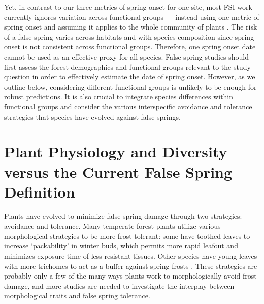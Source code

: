 \documentclass{article}\usepackage[]{graphicx}\usepackage[]{color}
\begin{document}
Yet, in contrast to our three metrics of spring onset for one site, most FSI work currently ignores variation across functional groups --- instead using one metric of spring onset and assuming it applies to the whole community of plants \citep{Marino2011, Peterson2014, Allstadt2015, Mehdipoor2017}. The risk of a false spring varies across habitats and with species composition since spring onset is not consistent across functional groups. Therefore, one spring onset date cannot be used as an effective proxy for all species. False spring studies should first assess the forest demographics and functional groups relevant to the study question in order to effectively estimate the date of spring onset. However, as we outline below, considering different functional groups is unlikely to be enough for robust predictions. It is also crucial to integrate species differences within functional groups and consider the various interspecific avoidance and tolerance strategies that species have evolved against false springs. %

\section {Plant Physiology and Diversity versus the Current False Spring Definition}
Plants have evolved to minimize false spring damage through two strategies: avoidance and tolerance. Many temperate forest plants utilize various morphological strategies to be more frost tolerant: some have toothed leaves to increase `packability' in winter buds, which permits more rapid leafout \citep{Edwards2017} and minimizes exposure time of less resistant tissues. Other species have young leaves with more trichomes to act as a buffer against spring frosts \citep{Prozherina2003, Agrawal2004}. These strategies are probably only a few of the many ways plants work to morphologically avoid frost damage, and more studies are needed to investigate the interplay between morphological traits and false spring tolerance. 
\end{document}
